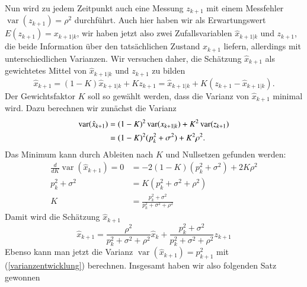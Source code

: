 Nun wird zu jedem Zeitpunkt auch eine Messung $z_{k+1}$ mit einem Messfehler
$\operatorname{var}(z_{k+1})=\rho^2$ durchführt.
Auch hier haben wir als Erwartungswert $E(z_{k+1})=x_{k+1|k}$,
wir haben jetzt also zwei Zufallsvariablen
$\hat x_{k+1|k}$ und $z_{k+1}$, die beide Information über den tatsächlichen
Zustand $x_{k+1}$ liefern, allerdings mit unterschiedlichen Varianzen.
Wir
versuchen daher, die Schätzung $\hat x_{k+1}$ als gewichtetes Mittel 
von $\hat x_{k+1|k}$ und $z_{k+1}$ zu bilden
\begin{equation}
\hat x_{k+1}=(1-K)\hat x_{k+1|k}+Kz_{k+1}=\hat x_{k+1|k}+K( z_{k+1} - \hat x_{k+1|k}).
\label{1dimentwicklung}
\end{equation}
Der Gewichtsfaktor $K$ soll so gewählt werden, dass die Varianz von $\hat x_{k+1}$
minimal wird.
Dazu berechnen wir zunächst die Varianz
\begin{align}
\operatorname{var}(\hat x_{k+1})
&=
(1-K)^2\operatorname{var}(x_{k+1|k})+K^2\operatorname{var}(z_{k+1})\notag\\
&=(1-K)^2(p_k^2+\sigma^2)+K^2\rho^2.\label{varianzentwicklung}
\end{align}
Das Minimum kann durch Ableiten nach $K$ und Nullsetzen gefunden werden:
\begin{align*}
\frac{d}{dK}\operatorname{var}(\hat x_{k+1})
=0&=
-2(1-K)(p_k^2+\sigma^2)+2K\rho^2\\
p_k^2+\sigma^2&=K(p_k^2+\sigma^2+\rho^2)\\
K&=\frac{p_k^2+\sigma^2}{p_k^2+\sigma^2+\rho^2}
\end{align*}
Damit wird die Schätzung $\hat x_{k+1}$
\[
\hat x_{k+1}=\frac{\rho^2}{p_k^2+\sigma^2+\rho^2}\hat x_k+\frac{p_k^2+\sigma^2}{p_k^2+\sigma^2+\rho^2}z_{k+1}
\]
Ebenso kann man jetzt die Varianz $\operatorname{var}(\hat x_{k+1})=p_{k+1}^2$
mit (\ref{varianzentwicklung}) berechnen.
Insgesamt haben wir also folgenden
Satz gewonnen

